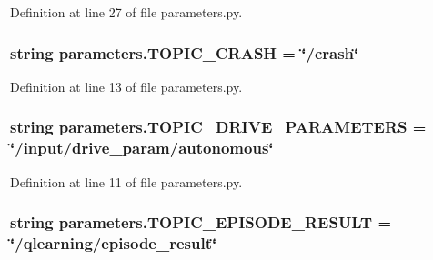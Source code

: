Definition at line 27 of file parameters.\+py.

\subsubsection[{\texorpdfstring{T\+O\+P\+I\+C\+\_\+\+C\+R\+A\+SH}{TOPIC_CRASH}}]{\setlength{\rightskip}{0pt plus 5cm}string parameters.\+T\+O\+P\+I\+C\+\_\+\+C\+R\+A\+SH = \char`\"{}/crash\char`\"{}}\hypertarget{namespaceparameters_a5e392ed4d998f10824bfd96a0eae2988}{}\label{namespaceparameters_a5e392ed4d998f10824bfd96a0eae2988}


Definition at line 13 of file parameters.\+py.

\subsubsection[{\texorpdfstring{T\+O\+P\+I\+C\+\_\+\+D\+R\+I\+V\+E\+\_\+\+P\+A\+R\+A\+M\+E\+T\+E\+RS}{TOPIC_DRIVE_PARAMETERS}}]{\setlength{\rightskip}{0pt plus 5cm}string parameters.\+T\+O\+P\+I\+C\+\_\+\+D\+R\+I\+V\+E\+\_\+\+P\+A\+R\+A\+M\+E\+T\+E\+RS = \char`\"{}/input/drive\+\_\+param/autonomous\char`\"{}}\hypertarget{namespaceparameters_a855cb11de60782b8e9997af80bdab518}{}\label{namespaceparameters_a855cb11de60782b8e9997af80bdab518}


Definition at line 11 of file parameters.\+py.

\subsubsection[{\texorpdfstring{T\+O\+P\+I\+C\+\_\+\+E\+P\+I\+S\+O\+D\+E\+\_\+\+R\+E\+S\+U\+LT}{TOPIC_EPISODE_RESULT}}]{\setlength{\rightskip}{0pt plus 5cm}string parameters.\+T\+O\+P\+I\+C\+\_\+\+E\+P\+I\+S\+O\+D\+E\+\_\+\+R\+E\+S\+U\+LT = \char`\"{}/qlearning/episode\+\_\+result\char`\"{}}\hypertarget{namespaceparameters_aa69db8cd2d598f0d10212ea8df6a2139}{}\label{namespaceparameters_aa69db8cd2d598f0d10212ea8df6a2139}


